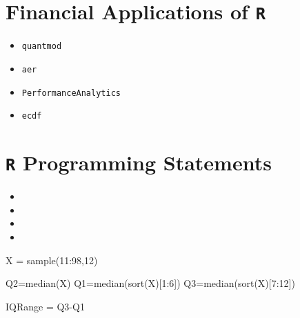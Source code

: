%
%



\section{Financial Applications of \texttt{R}}

\begin{itemize}
\item \texttt{quantmod}
\item \texttt{aer}
\item \texttt{PerformanceAnalytics}
\item \texttt{ecdf}
\end{itemize}

\section{\texttt{R} Programming Statements}
\begin{itemize}
\item
\item
\item
\item
\end{itemize}



X = sample(11:98,12)

Q2=median(X)
Q1=median(sort(X)[1:6])
Q3=median(sort(X)[7:12])

IQRange = Q3-Q1
